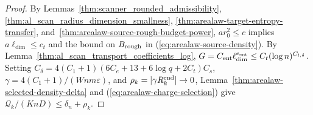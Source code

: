 \begin{proof}
    \leanok
    By Lemmas~\ref{thm:scanner_rounded_admissibility}, \ref{thm:al_scan_radius_dimension_smallness}, \ref{thm:arealaw-target-entropy-transfer}, and~\ref{thm:arealaw-source-rough-budget-power}, $ar_0^2\le c$ implies $a\ell_{\dim}\le c_t$ and the bound on $B_{\rm rough}$ in (\ref{eq:arealaw-source-density}). By Lemma~\ref{thm:al_scan_transport_coefficients_log}, $G=C_{\rm ent}\ell_{\dim}^{e_{\rm ent}}\le C_t(\log n)^{C_{l,\delta}}$. Setting $C_\delta=4(C_1+1)(6C_e+13+6\log q+2C_t)C_s$, $\gamma=4(C_1+1)/(Wnm\varepsilon)$, and $\rho_k=|\gamma R_k^{\rm end}|\to0$, Lemma~\ref{thm:arealaw-selected-density-delta} and (\ref{eq:arealaw-charge-selection}) give $\mathcal Q_k/(KnD)\le\delta_n+\rho_k$.
\end{proof}

